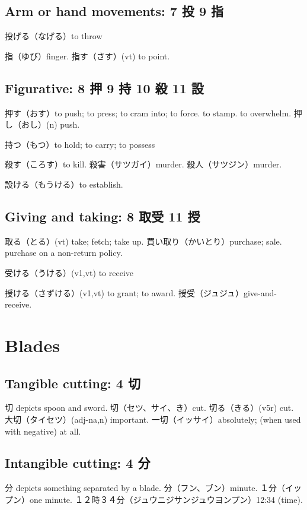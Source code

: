 \subsection{Arm or hand movements: 7 投 9 指}

投げる（なげる）to throw

指（ゆび）finger.
指す（さす）(vt) to point.

\subsection{Figurative: 8 押 9 持 10 殺 11 設}

押す（おす）to push; to press; to cram into; to force.
to stamp.
to overwhelm.
押し（おし）(n) push.

持つ（もつ）to hold; to carry; to possess

殺す（ころす）to kill.
殺害（サツガイ）murder.
殺人（サツジン）murder.

設ける（もうける）to establish.

\subsection{Giving and taking: 8 取受 11 授}

取る（とる）(vt) take; fetch; take up.
買い取り（かいとり）purchase; sale. purchase on a non-return policy.

受ける（うける）(v1,vt) to receive

授ける（さずける）(v1,vt) to grant; to award.
授受（ジュジュ）give-and-receive.

\section{Blades}

\subsection{Tangible cutting: 4 切}

切 depicts spoon and sword.
切（セツ、サイ、き）cut.
切る（きる）(v5r) cut.
大切（タイセツ）(adj-na,n) important.
一切（イッサイ）absolutely; (when used with negative) at all.

\subsection{Intangible cutting: 4 分}

分 depicts something separated by a blade.
分（フン、ブン）minute.
１分（イップン）one minute.
１２時３４分（ジュウニジサンジュウヨンプン）12:34 (time).

